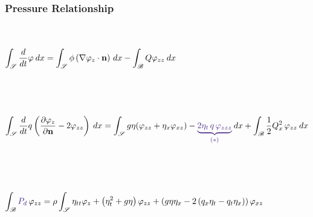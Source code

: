 \begin{frame}[t]\frametitle{Pressure Relationship}

    ~\\~\\
        \(\displaystyle \int_{\mathscr{S}}\frac{d}{dt}\varphi\: dx = \int_{\mathscr{S}}\phi\left(\nabla\varphi_z\cdot\mathbf{n}\right)\,dx - \int_{\mathscr{B}} Q\varphi_{zz}\:dx\)\hfill\large{}\normalsize \\~\\~\\

    ~\\~\\
        \(\displaystyle{\sint{\dt q\left(\normD{\varphi_z}-2\varphi_{zz}\right)\:dx} =  \sint{g\eta (\varphi_{zz}+\eta_x\varphi_{xz})-\emC{\underbrace{2\eta_t\,q\,\varphi_{zzz}}_{(*)}}\:dx} + \bint{\frac{1}{2}Q_x^2\,\varphi_{zz}\:dx}}\)\\~\\~\\
     
    ~\hfill\large{}\normalsize\\~\\
        \(\displaystyle\bint{\emC{P_d}\,\varphi_{zz}} = \rho\sint{\eta_{tt}\varphi_z+ \left(\eta_t^2 + g\eta\right)\varphi_{zz} + \left(g\eta\eta_x - 2\left(q_x\eta_t - q_t\eta_x\right)\right)\varphi_{xz}}\)

    \vfill
\end{frame}

